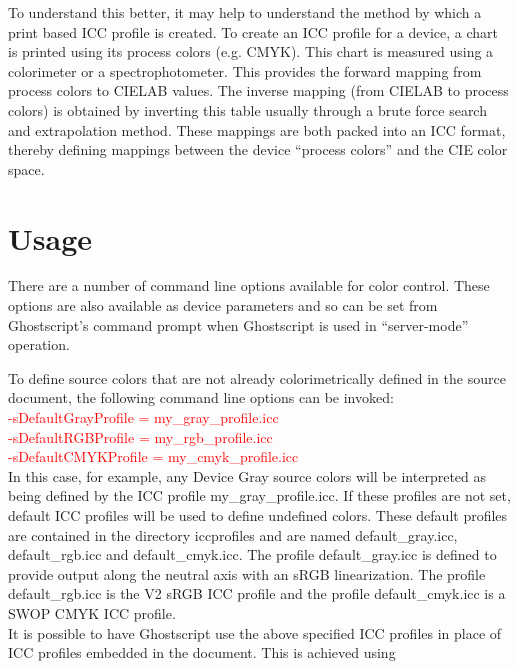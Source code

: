 \documentclass[12pt,notitlepage]{article}
\begin{document}
To understand this better, it may help to understand the method by which a print based ICC profile is created.  To create an ICC profile for a device, a chart is printed using its process colors (e.g. CMYK).  This chart is measured using a colorimeter or a spectrophotometer.  This provides the forward mapping from process colors to CIELAB values.  The inverse mapping (from CIELAB to process colors) is obtained by inverting this table usually through a brute force search and extrapolation method.  These mappings are both packed into an ICC format, thereby defining mappings between the device ``process colors'' and the CIE color space.

\section{Usage}

There are a number of command line options available for color control.  These options are also available as device parameters and so can be set from Ghostscript's command prompt when Ghostscript is used in ``server-mode'' operation.

To define source colors that are not already colorimetrically defined in the source document, the following command line options can be invoked:\\

\textcolor{red}{-sDefaultGrayProfile = my\_gray\_profile.icc}\\

\textcolor{red}{-sDefaultRGBProfile = my\_rgb\_profile.icc}\\

\textcolor{red}{-sDefaultCMYKProfile = my\_cmyk\_profile.icc}\\

 \noindent In this case, for example, any Device Gray source colors will be interpreted as being defined by the ICC profile my\_gray\_profile.icc.  If these profiles are not set, default ICC profiles will be used to define undefined colors.  These default profiles are contained in the directory iccprofiles and are named default\_gray.icc, default\_rgb.icc and default\_cmyk.icc.  The profile default\_gray.icc is defined to provide output along the neutral axis with an sRGB linearization.  The profile default\_rgb.icc is the V2 sRGB ICC profile and the profile default\_cmyk.icc is a SWOP CMYK ICC profile.\\

It is possible to have Ghostscript use the above specified ICC profiles in place of ICC profiles embedded in the document.  This is achieved using\\
\end{document}
